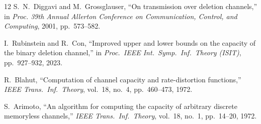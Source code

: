 \documentclass[conference]{IEEEtran}
\begin{document}
\begin{thebibliography}{12}
S.~N.~Diggavi and M.~Grossglauser, ``On transmission over deletion channels,''
in \emph{Proc. 39th Annual Allerton Conference on Communication, Control, and Computing},
2001, pp.~573--582.

I.~Rubinstein and R.~Con,
``Improved upper and lower bounds on the capacity of the binary
deletion channel,''
in \textit{Proc.\ IEEE Int.\ Symp.\ Inf.\ Theory (ISIT)},
pp.~927--932, 2023.

R.~Blahut,
``Computation of channel capacity and rate-distortion functions,''
\textit{IEEE Trans.\ Inf.\ Theory}, vol.~18, no.~4, pp.~460--473, 1972.

S.~Arimoto,
``An algorithm for computing the capacity of arbitrary discrete
memoryless channels,''
\textit{IEEE Trans.\ Inf.\ Theory}, vol.~18, no.~1, pp.~14--20, 1972.



\end{thebibliography}
\end{document}
